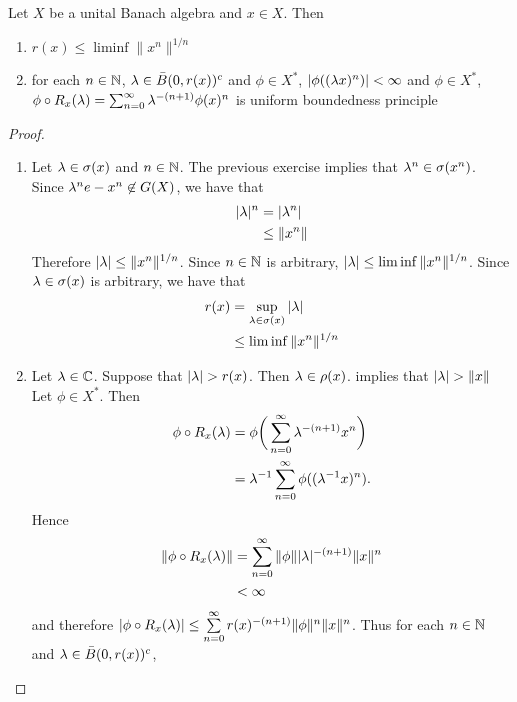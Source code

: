 \documentclass{book}
\begin{document}
	\begin{ex}
		Let $X$ be a unital Banach algebra and $x \in X$. Then
		\begin{enumerate}
			\item $r(x) \leq \liminf \|x^n\|^{1/n}$
			\item for each $n \in \mathbb{N}$, $\lambda \in \bar{B}(0, r(x))^c$ and $\phi \in X^*$, $|\phi((\lambda x)^n)| < \infty$ and $\phi \in X^*$, $\phi \circ R_x(\lambda) = \sum_{n=0}^{\infty} \lambda^{-(n+1)} \phi(x)^n$ is
			 uniform boundedness principle  
		\end{enumerate}
	\end{ex}

	\begin{proof}\
		\begin{enumerate}
			\item Let $\lambda \in \sigma(x)$ and $n \in \mathbb{N}$. The previous exercise implies that $\lambda^n \in \sigma(x^n)$. Since $\lambda^ne - x^n \not \in G(X)$, we have that
			\begin{align*}
				|\lambda|^n
				& = |\lambda^n| \\
				& \leq \|x^n\|
			\end{align*}
			Therefore $|\lambda| \leq \|x^n\|^{1/n}$. Since $n \in \mathbb{N}$ is arbitrary, $|\lambda| \leq \liminf \|x^n\|^{1/n}$. Since $\lambda \in \sigma(x)$ is arbitrary, we have that 
			\begin{align*}
				r(x)
				& = \sup_{\lambda \in \sigma(x)} |\lambda| \\
				& \leq \liminf \|x^n\|^{1/n}
			\end{align*} 
			\item Let $\lambda \in \mathbb{C}$. Suppose that $|\lambda| > r(x)$. Then $\lambda \in \rho(x)$.  implies that $|\lambda| > \|x\|$  Let $\phi \in X^*$. Then
			\begin{align*}
				\phi \circ R_x(\lambda) 
				& = \phi \bigg( \sum\limits_{n=0}^{\infty} \lambda^{-(n+1)} x^n \bigg) \\
				& = \lambda^{-1} \sum\limits_{n=0}^{\infty} \phi((\lambda^{-1} x)^n).
			\end{align*}
			Hence 
			\begin{align*}
				\|\phi \circ R_x(\lambda)\|
				& = \sum\limits_{n=0}^{\infty} \|\phi\| |\lambda|^{-(n+1)}  \|x\|^n \\
				& < \infty 
			\end{align*}
			and therefore $|\phi \circ R_x(\lambda)| \leq \sum\limits_{n=0}^{\infty} r(x)^{-(n+1)}\|\phi\|^n\|x\|^n$. Thus for each $n \in \mathbb{N}$ and $\lambda \in \bar{B}(0, r(x))^c$, 
			
		\end{enumerate}
	\end{proof}
	
\end{document}
